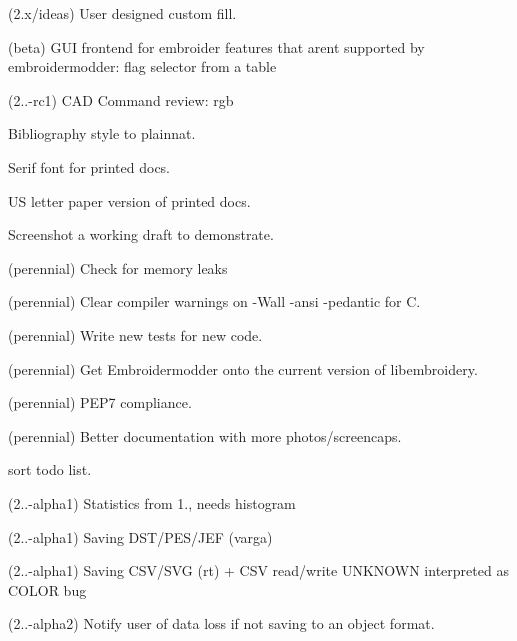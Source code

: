 \begin{DoxyRefList}
\label{todo__todo000386}%
%
(2.\+x/ideas) User designed custom fill.

\label{todo__todo000373}%
%
(beta) GUI frontend for embroider features that aren\textquotesingle{}t supported by embroidermodder\+: flag selector from a table

\label{todo__todo000267}%
%
(2..-\/rc1) CAD Command review\+: rgb

\label{todo__todo000224}%
%
Bibliography style to plainnat.

\label{todo__todo000225}%
%
Serif font for printed docs.

\label{todo__todo000226}%
%
US letter paper version of printed docs.

\label{todo__todo000227}%
%
Screenshot a working draft to demonstrate.

\label{todo__todo000228}%
%
(perennial) Check for memory leaks 



(perennial) Clear compiler warnings on {\ttfamily -\/Wall -\/ansi -\/pedantic} for C. 



(perennial) Write new tests for new code. 



(perennial) Get Embroidermodder onto the current version of libembroidery. 



(perennial) PEP7 compliance. 



(perennial) Better documentation with more photos/screencaps.

\label{todo__todo000229}%
%
sort todo list.

\label{todo__todo000230}%
%
(2..-\/alpha1) Statistics from 1., needs histogram

\label{todo__todo000231}%
%
(2..-\/alpha1) Saving DST/\+PES/\+JEF (varga)

\label{todo__todo000232}%
%
(2..-\/alpha1) Saving CSV/\+SVG (rt) + CSV read/write UNKNOWN interpreted as COLOR bug

\label{todo__todo000233}%
%
(2..-\/alpha2) Notify user of data loss if not saving to an object format.


\end{DoxyRefList}
